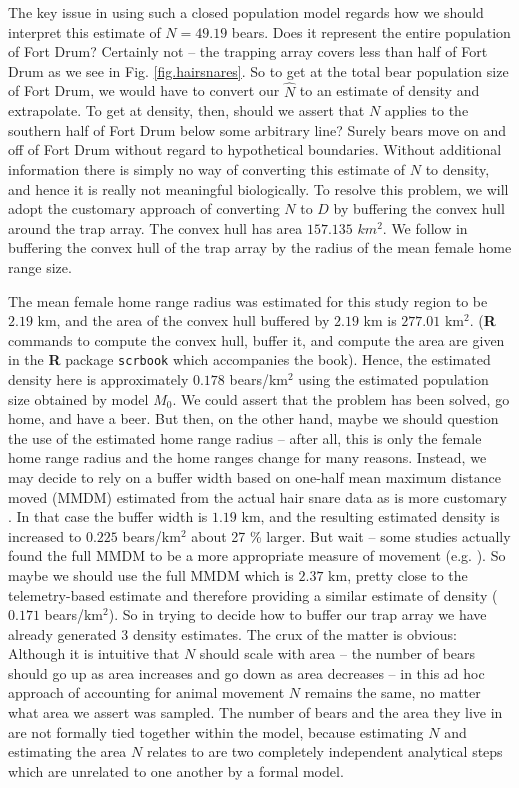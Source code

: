 The key issue in using such a closed population model regards how we
should interpret this estimate of $N=49.19$ bears. Does it represent
the entire population of Fort Drum? Certainly not -- the trapping
array covers less than half of Fort Drum as we see in
Fig. \ref{fig.hairsnares}. So to get at the total bear population size
of Fort Drum, we would have to convert our $\hat{N}$ to an estimate of
density and extrapolate. To get at density, then, should we assert
that $N$ applies to the southern half of Fort Drum below some
arbitrary line? Surely bears move on and off of Fort Drum without
regard to hypothetical boundaries. Without additional information
there is simply no way of converting this estimate of $N$ to density,
and hence it is really not meaningful biologically. To resolve this
problem, we will adopt the customary approach of converting $N$ to $D$
by buffering the convex hull around the trap array. The convex hull
has area $157.135$ $km^2$. We follow \citet{bales_etal:2005} in
buffering the convex hull of the trap array by the radius of the mean
female home range size.



The mean female home range radius was estimated \citep{wegan:2008} for
this study region to be $2.19$ km,
and the area of the convex hull buffered by $2.19$ km is $277.01$
km$^2$. ({\bf R} commands to compute the convex hull, buffer it, and
compute the area are given in the {\bf R} package \mbox{\tt scrbook}
which accompanies the book).  Hence, the estimated density here is
approximately $0.178$ bears/km$^2$ using the estimated population size
obtained by model $M_0$.  We could assert that the problem has been
solved, go home, and have a beer.  But then, on the other hand, maybe
we should question the use of the estimated home range radius -- after
all, this is only the female home range radius and the home ranges
change for many reasons. Instead, we may decide to rely on a buffer
width based on one-half mean maximum distance moved (MMDM) estimated
from the actual hair snare data as is more customary
\citep{dice:1938}. In that case the buffer width is $1.19$ km, and the
resulting estimated density is increased to $0.225$ bears/km$^2$ about
27 \% larger.  But wait -- some studies actually found the full MMDM
\citep{parmenter_etal:2003} to be a more appropriate measure of
movement (e.g. \citet{soisalo_cavalcanti:2006}). So maybe we should use
the full MMDM which is $2.37$ km, pretty close to the telemetry-based
estimate and therefore providing a similar estimate of density
($0.171$ bears/km$^2$). So in trying to decide how to buffer our trap
array we have already generated 3 density estimates. The crux of the
matter is obvious: Although it is intuitive that $N$ should scale with
area -- the number of bears should go up as area increases and go down
as area decreases -- in this ad hoc approach of accounting for animal
movement $N$ remains the same, no matter what area we assert was
sampled. The number of bears and the area they live in are not
formally tied together within the model, because estimating $N$ and
estimating the area $N$ relates to are two completely independent
analytical steps which are unrelated to one another by a formal model.

